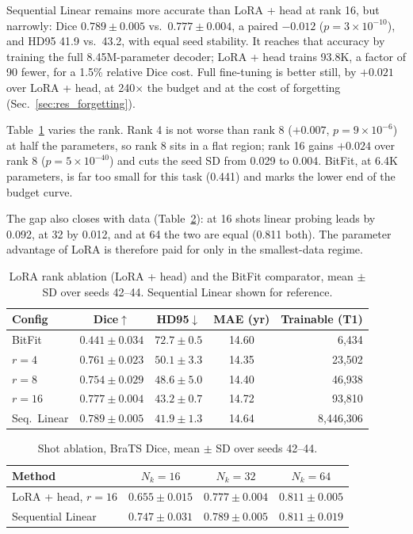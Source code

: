\documentclass[journal,twoside,web]{ieeecolor}
\begin{document}
Sequential Linear remains more accurate than LoRA + head at rank 16, but narrowly: Dice $0.789\pm0.005$ vs.\ $0.777\pm0.004$, a paired $-0.012$ ($p=3{\times}10^{-10}$), and HD95 41.9 vs.\ 43.2, with equal seed stability. It reaches that accuracy by training the full 8.45M-parameter decoder; LoRA + head trains 93.8K, a factor of 90 fewer, for a 1.5\% relative Dice cost. Full fine-tuning is better still, by $+0.021$ over LoRA + head, at 240$\times$ the budget and at the cost of forgetting (Sec.~\ref{sec:res_forgetting}).

Table~\ref{tab:rank} varies the rank. Rank 4 is not worse than rank 8 ($+0.007$, $p=9{\times}10^{-6}$) at half the parameters, so rank 8 sits in a flat region; rank 16 gains $+0.024$ over rank 8 ($p=5{\times}10^{-40}$) and cuts the seed SD from 0.029 to 0.004. BitFit, at 6.4K parameters, is far too small for this task (0.441) and marks the lower end of the budget curve.

The gap also closes with data (Table~\ref{tab:shot}): at 16 shots linear probing leads by 0.092, at 32 by 0.012, and at 64 the two are equal (0.811 both). The parameter advantage of LoRA is therefore paid for only in the smallest-data regime.

\begin{table}[t]
\caption{LoRA rank ablation (LoRA + head) and the BitFit comparator, mean $\pm$ SD over seeds 42--44. Sequential Linear shown for reference.}
\label{tab:rank}
\centering
\footnotesize
\setlength{\tabcolsep}{4pt}
\begin{tabular}{lcccr}
\toprule
Config & Dice$\uparrow$ & HD95$\downarrow$ & MAE (yr) & Trainable (T1) \\
\midrule
BitFit  & $0.441\pm0.034$ & $72.7\pm0.5$ & 14.60 & 6,434 \\
$r=4$   & $0.761\pm0.023$ & $50.1\pm3.3$ & 14.35 & 23,502 \\
$r=8$   & $0.754\pm0.029$ & $48.6\pm5.0$ & 14.40 & 46,938 \\
$r=16$  & $\mathbf{0.777\pm0.004}$ & $\mathbf{43.2\pm0.7}$ & 14.72 & 93,810 \\
\midrule
Seq.\ Linear & $0.789\pm0.005$ & $41.9\pm1.3$ & 14.64 & 8,446,306 \\
\bottomrule
\end{tabular}
\end{table}

\begin{table}[t]
\caption{Shot ablation, BraTS Dice, mean $\pm$ SD over seeds 42--44.}
\label{tab:shot}
\centering
\footnotesize
\setlength{\tabcolsep}{3pt}
\begin{tabular}{lccc}
\toprule
Method & $N_k=16$ & $N_k=32$ & $N_k=64$ \\
\midrule
LoRA + head, $r{=}16$ & $0.655\pm0.015$ & $0.777\pm0.004$ & $0.811\pm0.005$ \\
Sequential Linear     & $0.747\pm0.031$ & $0.789\pm0.005$ & $0.811\pm0.019$ \\
\bottomrule
\end{tabular}
\end{table}
\end{document}
